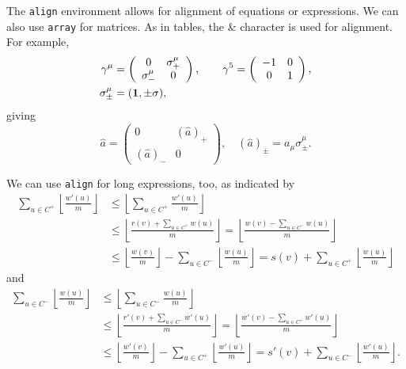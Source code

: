 \documentclass[12pt]{article}
\begin{document}
The \verb|align| environment allows for alignment of equations or expressions.  
We can also use \verb|array| for matrices.  As in tables, the \& character is
used for alignment.  For example, 
%
\begin{align}
\gamma^\mu & =
\left(
%
\begin{array}{cc}
0            & \sigma^\mu_+ \\
\sigma^\mu_- & 0
\end{array}
%
\right),
\qquad
\gamma^5= \left(
%
\begin{array}{cc}
-1 & 0 \\
0  & 1
\end{array}
%
\right),\nonumber\\
\sigma^\mu_{\pm} & = ({\bf1} ,\pm\sigma) , \nonumber
\end{align}
%
giving
%
\begin{equation}
\hat a= \left(
%
\begin{array}{cc}
0          & (\hat a)_+ \\
(\hat a)_- & 0
\end{array}
%
\right),\quad(\hat a)_\pm=a_\mu\sigma^\mu_\pm.
\end{equation}


We can use \verb|align| for long expressions, too, as indicated by
%
\begin{align}
\sum_{u\in C^+}\left\lfloor{\frac{w'(u)}{m}} \right\rfloor
    & \le \left\lfloor\sum_{u\in C^+} {\frac{w'(u)}{m}} \right\rfloor \nonumber \\
    & \le \left\lfloor{\frac{r(v)+\sum_{u\in C^+} w(u)}{m}} \right \rfloor = \left\lfloor{\frac{w(v)-\sum_{u\in C^-} w(u)}{m}} \right \rfloor \nonumber \\
    & \le \left\lfloor{\frac{w(v)}{m}} \right\rfloor -\sum_{u\in C^-}\left\lfloor{\frac{w(u)}{m}} \right\rfloor = s(v)+\sum_{u\in C^+}\left\lfloor{\frac{w(u)}{m}} \right\rfloor
\end{align}
%
and
%
\begin{align}
\sum_{u\in C^-}\left\lfloor{\frac{w(u)}{m}} \right\rfloor
    & \le \left\lfloor\sum_{u\in C^-} {\frac{w(u)}{m}} \right\rfloor \nonumber \\
    & \le \left\lfloor{\frac{r'(v)+\sum_{u\in C^-} w'(u)}{m}} \right \rfloor = \left\lfloor{\frac{w'(v)-\sum_{u\in C^+} w'(u)}{m}} \right\rfloor \nonumber\\
    & \le \left\lfloor{\frac{w'(v)}{m}} \right\rfloor -\sum_{u\in C^+}\left\lfloor{\frac{w'(u)}{m}} \right\rfloor = s'(v)+\sum _{u\in C^-}\left\lfloor{\frac{w'(u)}{m}} \right\rfloor .
\end{align}
%
\end{document}
